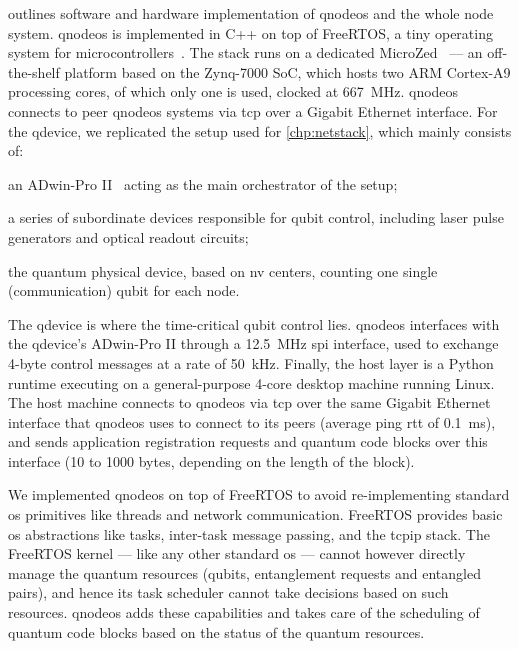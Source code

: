  outlines software and hardware implementation of \acrshort{qnodeos} and
the whole node system. \acrshort{qnodeos} is implemented in C++ on top of FreeRTOS, a tiny operating
system for microcontrollers~\cite{freertos}. The stack runs on a dedicated MicroZed~\cite{microzed}
--- an off-the-shelf platform based on the Zynq-7000 SoC, which hosts two ARM Cortex-A9 processing
cores, of which only one is used, clocked at \qty{667}{\MHz}. \acrshort{qnodeos} connects to peer
\acrshort{qnodeos} systems via \acrshort{tcp} over a Gigabit Ethernet interface. For the
\acrshort{qdevice}, we replicated the setup used for \cref{chp:netstack}, which mainly consists of:
%
\begin{inlinelist}
    \item an ADwin-Pro II~\cite{adwin} acting as the main orchestrator of the setup;
    \item a series of subordinate devices responsible for qubit control, including laser pulse
          generators and optical readout circuits;
    \item the quantum physical device, based on \acrshort{nv} centers, counting one single
          (communication) qubit for each node.
\end{inlinelist}
The \acrshort{qdevice} is where the time-critical qubit control lies. \acrshort{qnodeos} interfaces
with the \acrshort{qdevice}'s ADwin-Pro II through a \qty{12.5}{\MHz} \acrshort{spi} interface, used
to exchange 4-byte control messages at a rate of \qty{50}{kHz}. Finally, the host layer is a Python
runtime executing on a general-purpose 4-core desktop machine running Linux. The host machine
connects to \acrshort{qnodeos} via \acrshort{tcp} over the same Gigabit Ethernet interface that
\acrshort{qnodeos} uses to connect to its peers (average ping \acrshort{rtt} of \qty{0.1}{\ms}), and
sends application registration requests and quantum code blocks over this interface (\num{10} to
\num{1000} bytes, depending on the length of the block).

We implemented \acrshort{qnodeos} on top of FreeRTOS to avoid re-implementing standard \acrshort{os}
primitives like threads and network communication. FreeRTOS provides basic \acrshort{os}
abstractions like tasks, inter-task message passing, and the \acrshort{tcpip} stack. The FreeRTOS
kernel --- like any other standard \acrshort{os} --- cannot however directly manage the quantum
resources (qubits, entanglement requests and entangled pairs), and hence its task scheduler cannot
take decisions based on such resources. \acrshort{qnodeos} adds these capabilities and takes care of
the scheduling of quantum code blocks based on the status of the quantum resources.

